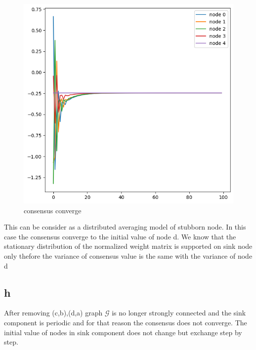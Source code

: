 \documentclass{article}
\begin{document}
\begin{figure}[!htbp]
    \centering
    \includegraphics[width=\linewidth]{fig/consensus_converge}   
    \caption{consensus converge}
   \label{fig:figure2}
\end{figure}

This can be consider as a distributed averaging model of stubborn node. In this case the consensus converge to the initial value of node d.
We know that the stationary distribution of the normalized weight matrix is supported on sink node only thefore the variance of consensus value 
is the same with the variance of node d

\subsection{h}
After removing (c,b),(d,a) graph $\mathcal{G}$ is no longer strongly connected and the sink component is periodic 
and for that reason the consensus does not converge. The initial value of nodes in sink component does not change but exchange step by step.
\end{document}
